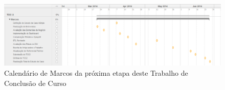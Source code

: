 \begin{figure}[ht!]
\centering
\includegraphics[keepaspectratio=false,scale=0.52]{figuras/marcostcc2.eps}
\caption{Calendário de Marcos da próxima etapa deste Trabalho de Conclusão de Curso}
\label{table}
\end{figure}
\FloatBarrier
